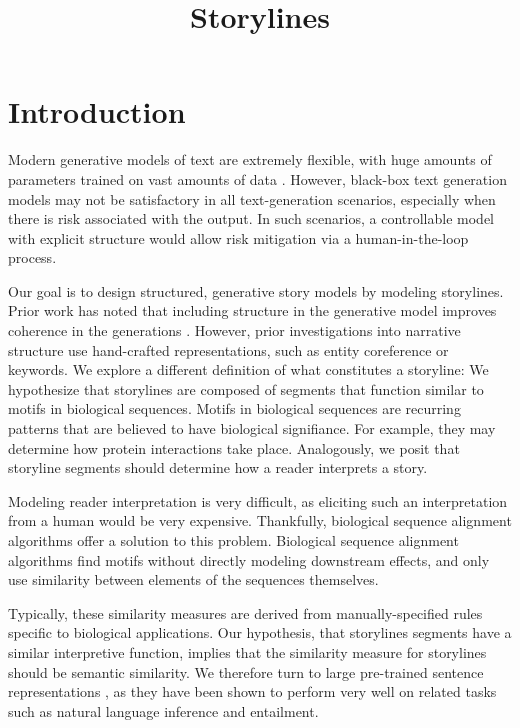 \documentclass{article}
\title{Storylines}
\begin{document}
\maketitle

\section{Introduction}
Modern generative models of text are extremely flexible, with huge amounts of parameters
trained on vast amounts of data \citep{brown2020language}.
However, black-box text generation models may not be satisfactory in all text-generation
scenarios, especially when there is risk associated with the output.
In such scenarios, a controllable model with explicit structure would allow
risk mitigation via a human-in-the-loop process.

Our goal is to design structured, generative story models by modeling storylines.
Prior work has noted that including structure in the generative model improves coherence
in the generations \citep{yao2018storyline,fan2019structure}.
However, prior investigations into narrative structure use hand-crafted representations,
such as entity coreference or keywords.
We explore a different definition of what constitutes a storyline:
We hypothesize that storylines are composed of segments that function
similar to motifs in biological sequences.
Motifs in biological sequences are recurring patterns that are believed to have
biological signifiance.
For example, they may determine how protein interactions take place.
Analogously, we posit that storyline segments should determine how a reader interprets
a story.

Modeling reader interpretation is very difficult, as eliciting such an interpretation from a human
would be very expensive.
Thankfully, biological sequence alignment algorithms offer a solution to this problem.
Biological sequence alignment algorithms find motifs without directly modeling
downstream effects, and only use similarity between elements of the sequences themselves.

Typically, these similarity measures are derived from manually-specified rules specific
to biological applications.
Our hypothesis, that storylines segments have a similar interpretive function,
implies that the similarity measure for storylines should be semantic similarity.
We therefore turn to large pre-trained sentence representations \citep{reimers2019sbert},
as they have been shown to perform very well on related tasks such as natural language 
inference and entailment.
\end{document}
